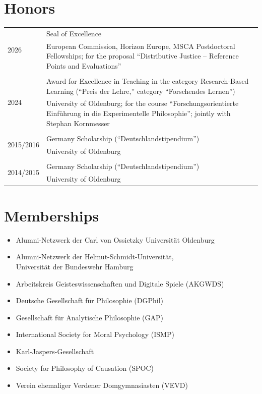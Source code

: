 \documentclass[a4paper,10pt]{article}
\begin{document}
\section{Honors}
\begin{longtable}{p{2.5cm}p{11cm}}
\multirow{2}{2.5cm}{\footnotesize{2026}} & Seal of Excellence\\
& \footnotesize{European Commission, Horizon Europe, MSCA Postdoctoral Fellowships; for the proposal \enquote{Distributive Justice -- Reference Points and Evaluations}}\\
\\
\multirow{2}{2.5cm}{\footnotesize{2024}} & Award for Excellence in Teaching in the category Research-Based Learning (\enquote{Preis der Lehre,} category \enquote{Forschendes Lernen})\\
& \footnotesize{University of Oldenburg; for the course \enquote{Forschungsorientierte Einführung in die Experimentelle Philosophie}; jointly with Stephan Kornmesser}\\
\\
\multirow{2}{2.5cm}{\footnotesize{2015/2016}} & Germany Scholarship (\enquote{Deutschlandstipendium})\\
& \footnotesize{University of Oldenburg}\\
\\
\multirow{2}{2.5cm}{\footnotesize{2014/2015}} & Germany Scholarship (\enquote{Deutschlandstipendium})\\
& \footnotesize{University of Oldenburg}\\
\end{longtable}


\clearpage
\section{Memberships}
\begin{itemize}
   \item Alumni-Netzwerk der Carl von Ossietzky Universität Oldenburg
   \item Alumni-Netzwerk der Helmut-Schmidt-Universität,\\Universität der Bundeswehr Hamburg
   \item Arbeitskreis Geisteswissenschaften und Digitale Spiele (AKGWDS)
   \item Deutsche Gesellschaft für Philosophie (DGPhil)
   \item Gesellschaft für Analytische Philosophie (GAP)
   \item International Society for Moral Psychology  (ISMP)
   \item Karl-Jaspers-Gesellschaft
   \item Society for Philosophy of Causation (SPOC)
   \item Verein ehemaliger Verdener Domgymnasiasten (VEVD)
\end{itemize}
\end{document}
